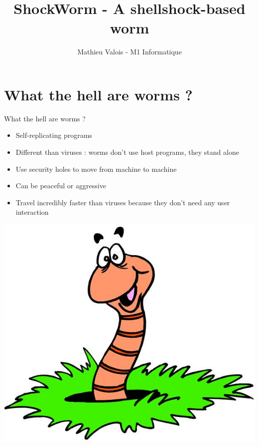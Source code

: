 \documentclass[11pt]{beamer}
\author{Mathieu Valois - M1 Informatique}
\title{ShockWorm - A shellshock-based worm}
\institute{Université de Caen Basse-Normandie}
\begin{document}
\begin{frame}
\titlepage
\end{frame}

\begin{frame}
\tableofcontents
\end{frame}

\section{What the hell are worms ?}
\begin{frame}{What the hell are worms ?}
\begin{itemize}
\item Self-replicating programs
\item Different than viruses : worms don't use host programs, they stand alone
\item Use security holes to move from machine to machine
\item Can be peaceful or aggressive
\item Travel incredibly faster than viruses because they don't need any user interaction
\end{itemize}
\begin{center}
\includegraphics[scale=0.1]{worm.jpeg}
\end{center}
\end{frame}
\end{document}
